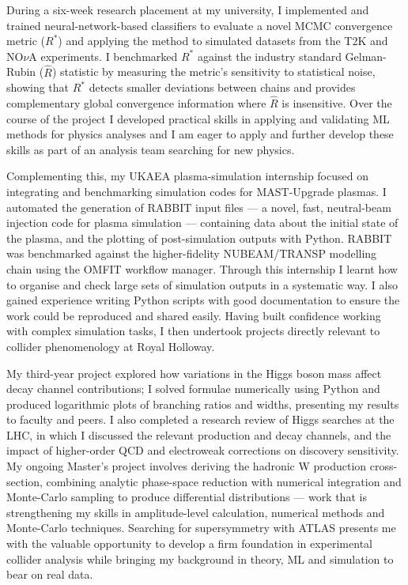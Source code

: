 \documentclass[11pt]{report}
\begin{document}
\begin{titlepage}
	During a six-week research placement at my university, I implemented and trained neural-network-based classifiers to evaluate a novel MCMC convergence metric ($R^*$) and applying the method to simulated datasets from the T2K and NO$\nu$A experiments. I benchmarked $R^*$ against the industry standard Gelman-Rubin ($\hat{R}$) statistic by measuring the metric’s sensitivity to statistical noise, showing that $R^*$ detects smaller deviations between chains and provides complementary global convergence information where  $\hat{R}$ is insensitive. Over the course of the project I developed practical skills in applying and validating ML methods for physics analyses and I am eager to apply and further develop these skills as part of an analysis team searching for new physics.\\
	\vspace{0.7em}
	
	Complementing this, my UKAEA plasma-simulation internship focused on integrating and benchmarking simulation codes for MAST-Upgrade plasmas. I automated the generation of RABBIT input files --- a novel, fast, neutral-beam injection code for plasma simulation --- containing data about the initial state of the plasma, and the plotting of post-simulation outputs with Python. RABBIT was benchmarked against the higher-fidelity NUBEAM/TRANSP modelling chain using the OMFIT workflow manager. Through this internship I learnt how to organise and check large sets of simulation outputs in a systematic way. I also gained experience writing Python scripts with good documentation to ensure the work could be reproduced and shared easily. Having built confidence working with complex simulation tasks, I then undertook projects directly relevant to collider phenomenology at Royal Holloway.\\
	\vspace{0.7em}
	
	My third-year project explored how variations in the Higgs boson mass affect decay channel contributions; I solved formulae numerically using Python and produced logarithmic plots of branching ratios and widths, presenting my results to faculty and peers. I also completed a research review of Higgs searches at the LHC, in which I discussed the relevant production and decay channels, and the impact of higher-order QCD and electroweak corrections on discovery sensitivity. My ongoing Master’s project involves deriving the hadronic W production cross-section, combining analytic phase-space reduction with numerical integration and Monte-Carlo sampling to produce differential distributions — work that is strengthening my skills in amplitude-level calculation, numerical methods and Monte-Carlo techniques. Searching for supersymmetry with ATLAS presents me with the valuable opportunity to develop a firm foundation in experimental collider analysis while bringing my background in theory, ML and simulation to bear on real data.\\
	\vspace{0.7em}
	

\end{titlepage}
\end{document}
